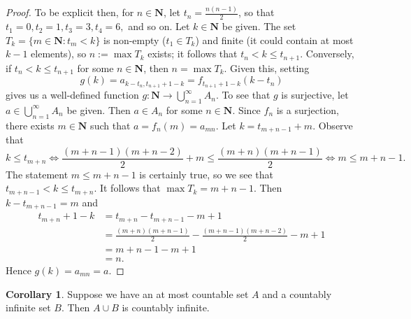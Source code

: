 \documentclass[12pt]{article}
\theoremstyle{definition}
\newtheorem{corollary}[definition]{Corollary}
\newcommand{\N}{\mathbf{N}}
\begin{document}
\begin{proof}
    \noindent To be explicit then, for \( n \in \N \), let \( t_n = \tfrac{n(n-1)}{2} \), so that \( t_1 = 0, t_2 = 1, t_3 = 3, t_4 = 6, \) and so on. Let \( k \in \N \) be given. The set \( T_k = \{ m \in \N : t_m < k \} \) is non-empty (\( t_1 \in T_k \)) and finite (it could contain at most \( k - 1 \) elements), so \( n := \max T_k \) exists; it follows that \( t_n < k \leq t_{n+1} \). Conversely, if \( t_n < k \leq t_{n+1} \) for some \( n \in \N \), then \( n = \max T_k \). Given this, setting
    \[
        g(k) = a_{k - t_n,t_{n+1} + 1 - k} = f_{t_{n+1} + 1 - k}(k - t_n)
    \]
    gives us a well-defined function \( g : \N \to \bigcup_{n=1}^{\infty} A_n \). To see that \( g \) is surjective, let \( a \in \bigcup_{n=1}^{\infty} A_n \) be given. Then \( a \in A_n \) for some \( n \in \N \). Since \( f_n \) is a surjection, there exists \( m \in \N \) such that \( a = f_n(m) = a_{mn} \). Let \( k = t_{m + n - 1} + m \). Observe that
    \[
        k \leq t_{m+n} \iff \frac{(m+n-1)(m+n-2)}{2} + m \leq \frac{(m+n)(m+n-1)}{2} \iff m \leq m + n - 1.
    \]
    The statement \( m \leq m + n - 1 \) is certainly true, so we see that \( t_{m+n-1} < k \leq t_{m+n} \). It follows that \( \max T_k = m + n - 1 \). Then \( k - t_{m+n-1} = m \) and
    \begin{align*}
        t_{m+n} + 1 - k &= t_{m+n} - t_{m+n-1} - m + 1 \\
        &= \frac{(m+n)(m+n-1)}{2} - \frac{(m+n-1)(m+n-2)}{2} - m + 1 \\
        &= m + n - 1 - m + 1 \\
        &= n.
    \end{align*}
    Hence \( g(k) = a_{mn} = a \).
\end{proof}

\begin{corollary}
\label{cor:union_of_amc_set_and_countable_set_is_countable}
    Suppose we have an at most countable set \( A \) and a countably infinite set \( B \). Then \( A \cup B \) is countably infinite.
\end{corollary}
\end{document}
